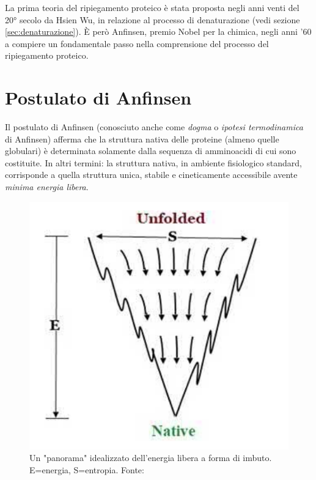 \par La prima teoria del ripiegamento proteico è stata proposta negli anni venti del 20° secolo da Hsien Wu\supercite{wu1931studies}, in relazione al processo di denaturazione (vedi sezione \ref{sec:denaturazione}). È però Anfinsen, premio Nobel per la chimica, negli anni '60 a compiere un fondamentale passo nella comprensione del processo del ripiegamento proteico\supercite{anfinsen1972formation}. 


\section{Postulato di Anfinsen}
Il postulato di Anfinsen (conosciuto anche come \textit{dogma} o \textit{ipotesi termodinamica} di Anfinsen) afferma che la struttura nativa delle proteine (almeno quelle globulari) è determinata solamente dalla sequenza di amminoacidi di cui sono costituite. In altri termini: la struttura nativa, in ambiente fisiologico standard, corrisponde a quella struttura unica, stabile e cineticamente accessibile avente \textit{minima energia libera}. 

\begin{figure}[h]
	\centering
	\includegraphics[scale=0.3]{images/funnel-folding.png}
	\caption{Un "panorama" idealizzato dell'energia libera a forma di imbuto. E=energia, S=entropia. Fonte: \cite{pal2019fundamentals}}
	\label{fig:funnel}
\end{figure}

